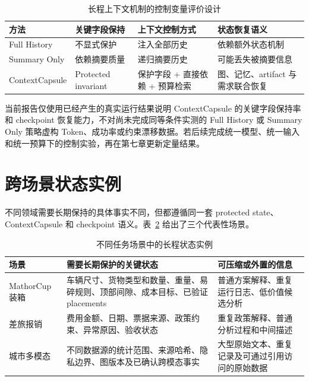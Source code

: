 \documentclass[UTF8,a4paper,12pt,oneside]{ctexbook}
\begin{document}
\begin{table}[htbp]
\centering
\caption{长程上下文机制的控制变量评价设计}
\label{tab:memory-ablation-design}
\begin{tabularx}{0.96\textwidth}{p{}X X X}
\toprule
方法
& 关键字段保持
& 上下文控制方式
& 状态恢复语义\\
\midrule

Full History
& 不显式保护
& 注入全部历史
& 依赖额外状态机制\\

Summary Only
& 依赖摘要质量
& 递归摘要历史
& 可能丢失被摘要信息\\

ContextCapsule
& Protected invariant
& 保护字段 + 直接依赖 + 预算检索
& 图、记忆、artifact 与需求联合恢复\\

\bottomrule
\end{tabularx}
\end{table}

当前报告仅使用已经产生的真实运行结果说明 ContextCapsule 的关键字段保持率和 checkpoint 恢复能力，不对尚未完成同等条件实测的 Full History 或 Summary Only 策略虚构 Token、成功率或约束漂移数据。若后续完成统一模型、统一输入和统一预算下的控制实验，再在第七章更新定量结果。


\section{跨场景状态实例}

不同领域需要长期保持的具体事实不同，但都遵循同一套 protected state、ContextCapsule 和 checkpoint 语义。表~\ref{tab:cross-domain-memory} 给出了三个代表性场景。

\begin{table}[htbp]
\centering
\caption{不同任务场景中的长程状态实例}
\label{tab:cross-domain-memory}
\begin{tabularx}{0.96\textwidth}{p{}X X}
\toprule
场景
& 需要长期保护的关键状态
& 可压缩或外置的信息\\
\midrule

MathorCup 装箱
&
车辆尺寸、货物类型和数量、重量、易碎规则、顶部间隙、成本目标、已验证 placements
&
普通方案解释、重复运行日志、低价值候选分析\\

差旅报销
&
费用金额、日期、票据来源、政策约束、异常原因、验收状态
&
重复政策解释、普通分析过程和中间描述\\

城市多模态
&
不同数据源的统计范围、来源哈希、隐私边界、图版本及已确认跨模态事实
&
大型原始文本、重复记录及可通过引用访问的原始数据\\

\bottomrule
\end{tabularx}
\end{table}
\end{document}
